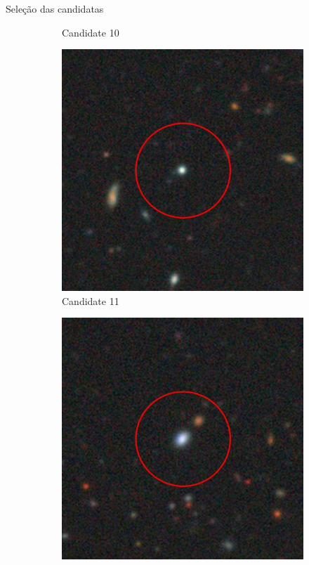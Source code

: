 \begin{frame}[c]{Seleção das candidatas}
\begin{figure}[]
\begin{subfigure}[b]{0.13\textwidth}
            \caption{Candidate 10}
        \end{subfigure}
        \begin{subfigure}[b]{0.13\textwidth}
            \includegraphics[width=\textwidth]{images/candidata_final/11.jpg}
            \caption{Candidate 11}
        \end{subfigure}
        \begin{subfigure}[b]{0.13\textwidth}
            \includegraphics[width=\textwidth]{images/candidata_final/12.jpg}

\end{subfigure}
\end{figure}
\end{frame}
